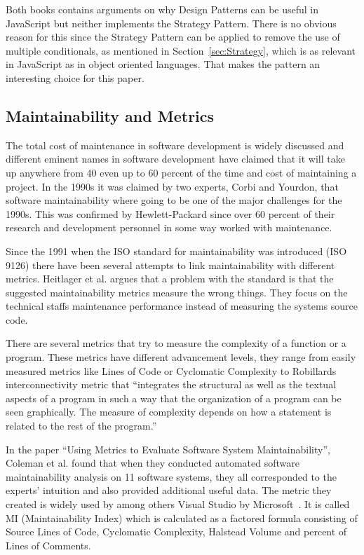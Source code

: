 \documentclass[conference, a4paper]{IEEEtran}
\begin{document}
Both books contains arguments on why Design Patterns can be useful in JavaScript but neither implements the Strategy Pattern. There is no obvious reason for this since the Strategy Pattern can be applied to remove the use of multiple conditionals, as mentioned in Section~\ref{sec:Strategy}, which is as relevant in JavaScript as in object oriented languages. That makes the pattern an interesting choice for this paper.

\subsection{Maintainability and Metrics}
\label{sec:Maintainability}
The total cost of maintenance in software development is widely discussed and different eminent names in software development have claimed that it will take up anywhere from 40 even up to 60 percent of the time and cost of maintaining a project. In the 1990s it was claimed by two experts, Corbi and Yourdon, that software maintainability where going to be one of the major challenges for the 1990s. This was confirmed by Hewlett-Packard since over 60 percent of their research and development personnel in some way worked with maintenance.~\cite{bibitem:MetricsToEvaluate}

Since the 1991 when the ISO standard for maintainability was introduced (ISO 9126) there have been several attempts to link maintainability with different metrics. Heitlager et al. argues that a problem with the standard is that the suggested maintainability metrics measure the wrong things. They focus on the technical staffs maintenance performance instead of measuring the systems source code.~\cite{bibitem:Maintainability}

There are several metrics that try to measure the complexity of a function or a program. These metrics have different advancement levels, they range from easily measured metrics like Lines of Code or Cyclomatic Complexity to Robillards interconnectivity metric that ``integrates the structural as well as the textual aspects of a program in such a way that the organization of a program can be seen graphically. The measure of complexity depends on how a statement is related to the rest of the program.''~\cite{bibitem:Robillard}

In the paper ``Using Metrics to Evaluate Software System Maintainability'', Coleman et al. found that when they conducted automated software maintainability analysis on 11 software systems, they all corresponded to the experts' intuition and also provided additional useful data. The metric they created is widely used by among others Visual Studio by Microsoft~\cite{bibitem:MI}. It is called MI (Maintainability Index) which is calculated as a factored formula consisting of Source Lines of Code, Cyclomatic Complexity, Halstead Volume and percent of Lines of Comments.~\cite{bibitem:MetricsToEvaluate}
\end{document}
